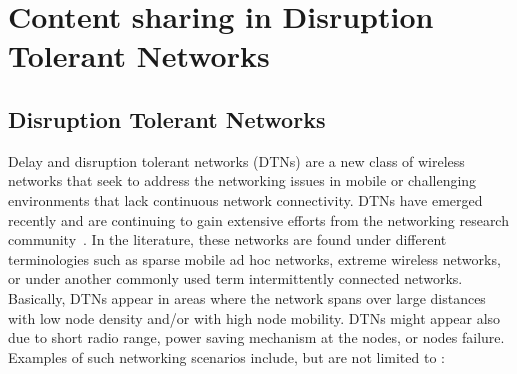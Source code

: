 \section{Content sharing in Disruption Tolerant Networks}

\subsection{Disruption Tolerant Networks}

Delay and disruption tolerant networks (DTNs) are a new class of wireless networks that seek to address the networking issues in mobile or challenging environments that lack continuous network connectivity. DTNs have emerged recently and are continuing to gain extensive efforts from the networking research community~\cite{Bundle,fall03,dtnrg}. In the literature, these networks are found under different terminologies such as sparse mobile ad hoc networks, extreme wireless networks, or under another commonly used term intermittently connected networks. Basically, DTNs appear in areas where the network spans over large distances with low node density and/or with high node mobility. DTNs might appear also due to short radio range, power saving mechanism at the nodes, or nodes failure. Examples of such networking scenarios include, but are not limited to :

